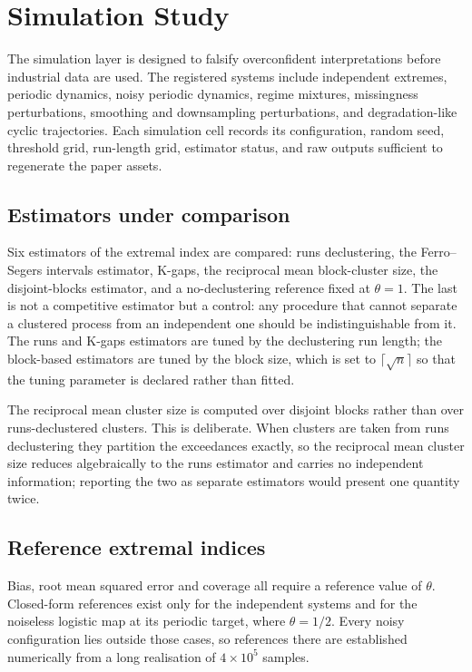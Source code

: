 \section{Simulation Study}
\label{sec:simulation}

The simulation layer is designed to falsify overconfident interpretations before industrial data are used. The registered systems include independent extremes, periodic dynamics, noisy periodic dynamics, regime mixtures, missingness perturbations, smoothing and downsampling perturbations, and degradation-like cyclic trajectories. Each simulation cell records its configuration, random seed, threshold grid, run-length grid, estimator status, and raw outputs sufficient to regenerate the paper assets.

\subsection{Estimators under comparison}

Six estimators of the extremal index are compared: runs declustering, the Ferro--Segers intervals estimator, K-gaps, the reciprocal mean block-cluster size, the disjoint-blocks estimator, and a no-declustering reference fixed at \(\theta = 1\). The last is not a competitive estimator but a control: any procedure that cannot separate a clustered process from an independent one should be indistinguishable from it. The runs and K-gaps estimators are tuned by the declustering run length; the block-based estimators are tuned by the block size, which is set to \(\lceil \sqrt{n} \rceil\) so that the tuning parameter is declared rather than fitted.

The reciprocal mean cluster size is computed over disjoint blocks rather than over runs-declustered clusters. This is deliberate. When clusters are taken from runs declustering they partition the exceedances exactly, so the reciprocal mean cluster size reduces algebraically to the runs estimator and carries no independent information; reporting the two as separate estimators would present one quantity twice.

\subsection{Reference extremal indices}

Bias, root mean squared error and coverage all require a reference value of \(\theta\). Closed-form references exist only for the independent systems and for the noiseless logistic map at its periodic target, where \(\theta = 1/2\). Every noisy configuration lies outside those cases, so references there are established numerically from a long realisation of \(4 \times 10^{5}\) samples.

